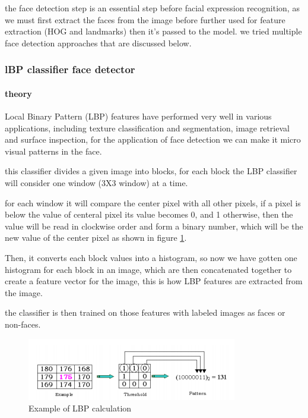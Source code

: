 the face detection step is an essential step before facial expression recognition, as we must first extract the faces from the image before further used for feature extraction (HOG and landmarks) then it's passed to the model.
\newline
we tried multiple face detection approaches that are discussed below.
\subsubsection{lBP classifier face detector}

\paragraph{theory}
Local Binary Pattern (LBP) features have performed very well in various applications, including texture classification and segmentation, image retrieval and surface inspection, for the application of face detection we can make it micro visual patterns in the face.

this classifier divides a given image into blocks, for each block the LBP classifier will consider one window (3X3 window) at a time.\newline

for each window it will compare the center pixel with all other pixels, if a pixel is below the value of centeral pixel its value becomes 0, and 1 otherwise, then the value will be read in clockwise order and form a binary number, which will be the new value of the center pixel as shown in figure \ref{fig:LBP_calculation}.\newline

Then, it converts each block values into a histogram, so now we have gotten one histogram for each block in an image, which are then concatenated together to create a feature vector for the image, this is how LBP features are extracted from the image.

the classifier is then trained on those features with labeled images as faces or non-faces.
\begin{figure}
	\centering
	\includegraphics{images/LBP_classifier.png}
	\caption{Example of LBP calculation}
	\label{fig:LBP_calculation}
\end{figure}

